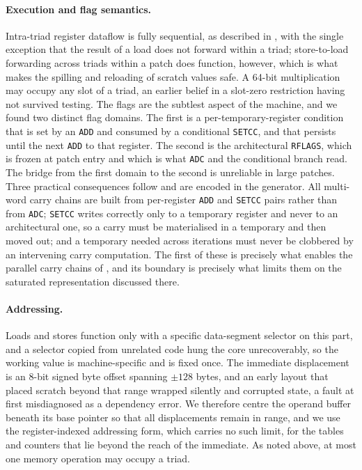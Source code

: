 \paragraph{Execution and flag semantics.}
Intra-triad register dataflow is fully sequential, as described in
, with the single exception that the result of a load
does not forward within a triad; store-to-load forwarding across triads within a
patch does function, however, which is what makes the spilling and reloading of
scratch values safe. A 64-bit multiplication may occupy any slot of a triad, an
earlier belief in a slot-zero restriction having not survived testing. The flags
are the subtlest aspect of the machine, and we found two distinct flag domains.
The first is a per-temporary-register condition that is set by an \texttt{ADD}
and consumed by a conditional \texttt{SETCC}, and that persists until the next
\texttt{ADD} to that register. The second is the architectural \texttt{RFLAGS},
which is frozen at patch entry and which is what \texttt{ADC} and the conditional
branch read. The bridge from the first domain to the second is unreliable in
large patches. Three practical consequences follow and are encoded in the
generator. All multi-word carry chains are built from per-register \texttt{ADD}
and \texttt{SETCC} pairs rather than from \texttt{ADC}; \texttt{SETCC} writes
correctly only to a temporary register and never to an architectural one, so a
carry must be materialised in a temporary and then moved out; and a temporary
needed across iterations must never be clobbered by an intervening carry
computation. The first of these is precisely what enables the parallel carry
chains of , and its boundary is precisely what limits them
on the saturated representation discussed there.

\paragraph{Addressing.}
Loads and stores function only with a specific data-segment selector on this
part, and a selector copied from unrelated code hung the core unrecoverably, so
the working value is machine-specific and is fixed once. The immediate
displacement is an 8-bit signed byte offset spanning $\pm 128$ bytes, and an
early layout that placed scratch beyond that range wrapped silently and
corrupted state, a fault at first misdiagnosed as a dependency error. We
therefore centre the operand buffer beneath its base pointer so that all
displacements remain in range, and we use the register-indexed addressing form,
which carries no such limit, for the tables and counters that lie beyond the
reach of the immediate. As noted above, at most one memory operation may occupy
a triad.

